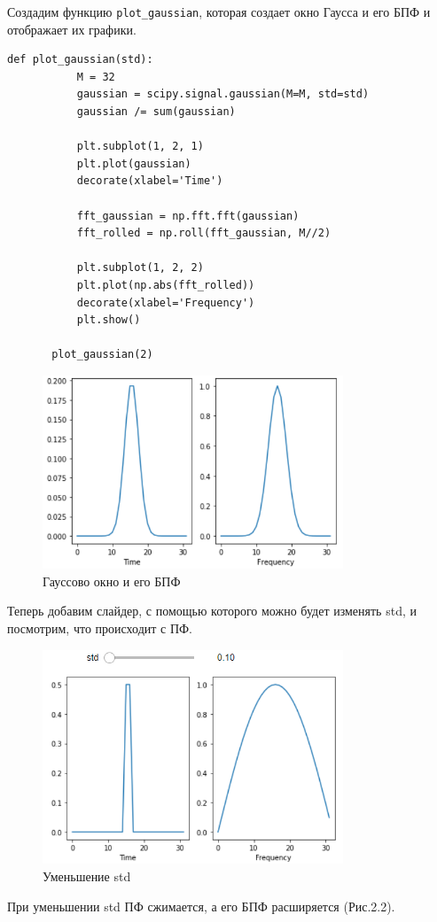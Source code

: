 \documentclass[a4paper,12pt]{report}
\begin{document}
    Создадим функцию \texttt{plot\_gaussian}, которая создает окно Гаусса и его БПФ и отображает их графики. 
\begin{lstlisting}[caption=Функция plot\_gaussian]
       def plot_gaussian(std):
           M = 32
           gaussian = scipy.signal.gaussian(M=M, std=std)
           gaussian /= sum(gaussian)
    
           plt.subplot(1, 2, 1)
           plt.plot(gaussian)
           decorate(xlabel='Time')

           fft_gaussian = np.fft.fft(gaussian)
           fft_rolled = np.roll(fft_gaussian, M//2)
    
           plt.subplot(1, 2, 2)
           plt.plot(np.abs(fft_rolled))
           decorate(xlabel='Frequency')
           plt.show()

       plot_gaussian(2)
\end{lstlisting}    
\begin{figure}[H]
        \centering
        \includegraphics[width=0.8\textwidth]{fig2-1.PNG}
        \caption{Гауссово окно и его БПФ}
        \label{fig:fig2-1}
\end{figure}

    Теперь добавим слайдер, с помощью которого можно будет изменять std, и посмотрим, что происходит с ПФ.
    
\begin{figure}[H]
        \centering
        \includegraphics[width=0.8\textwidth]{fig2-2.PNG}
        \caption{Уменьшение std}
        \label{fig:fig2-2}
\end{figure}   
    При уменьшении std ПФ сжимается, а его БПФ расширяется (Рис.2.2).
    
\end{document}
